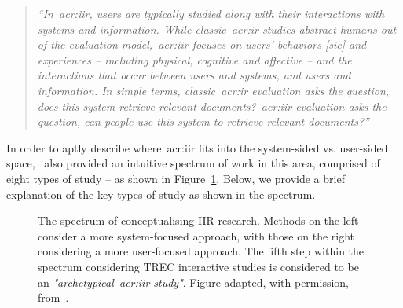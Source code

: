 \begin{quote}
\emph{``In~\gls{acr:iir}, users are typically studied along with their interactions with systems and information. While classic~\gls{acr:ir} studies abstract humans out of the evaluation model,~\gls{acr:iir} focuses on users' behaviors [sic] and experiences -- including physical, cognitive and affective -- and the interactions that occur between users and systems, and users and information. In simple terms, classic~\gls{acr:ir} evaluation asks the question, does this system retrieve relevant documents?~\gls{acr:iir} evaluation asks the question, can people use this system to retrieve relevant documents?''}
\end{quote}

In order to aptly describe where~\gls{acr:iir} fits into the system-sided vs. user-sided space,~\cite{kelly2009iir} also provided an intuitive spectrum of work in this area, comprised of eight types of study -- as shown in Figure~\ref{fig:spectrum}. Below, we provide a brief explanation of the key types of study as shown in the spectrum.

\begin{figure}[t!]
    \centering
    \caption[Spectrum IIR research~\citep{kelly2009iir}]{The spectrum of conceptualising IIR research. Methods on the left consider a more system-focused approach, with those on the right considering a more user-focused approach. The fifth step within the spectrum considering TREC interactive studies is considered to be an \emph{"archetypical~\gls{acr:iir} study"}. Figure adapted, with permission, from~\cite{kelly2009iir}.}
    \label{fig:spectrum}
\end{figure}


